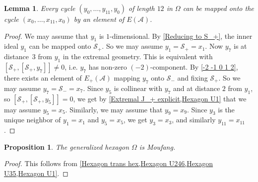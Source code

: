 \documentclass[oneside,a4paper]{amsart} %
\newtheorem{lemma}[theorem]{Lemma}
\newtheorem{proposition}[theorem]{Proposition}
\theoremstyle{definition}
\newcommand{\A}{\mathcal{A}}
\renewcommand{\SS}{\mathcal{S}}
\numberwithin{equation}{section}
\begin{document}
\begin{lemma}
\label{Hexagon trans hex}
	Every cycle $(y_0,\dots,y_{11},y_0)$ of length $12$ in $\Omega$ can be mapped onto the cycle $(x_0,\dots,x_{11},x_0)$ by an element of $E(\A)$.
\end{lemma}
\begin{proof}
	We may assume that $y_1$ is $1$-dimensional.
	By \cref{Reducing to S_+}, the inner ideal $y_1$ can be mapped onto $\SS_+$.
	So we may assume $y_1=\SS_+=x_1$.
	Now $y_7$ is at distance~$3$ from $y_1$ in the extremal geometry.
	This is equivalent with $[\SS_+,[\SS_+,y_7]]\neq 0$, i.e. $y_7$ has non-zero $(-2)$-component.
	By \cref{-2 -1 0 1 2}, there exists an element of $E_+(\A)$ mapping $y_7$ onto $\SS_-$ and fixing $\SS_+$.
	So we may assume $y_7=\SS_-=x_7$.
	Since $y_5$ is collinear with $y_7$ and at distance $2$ from $y_1$, so $[\SS_+,[\SS_+,y_5]]=0$, we get by \cref{Extremal J_+ explicit,Hexagon U1} that we may assume $y_5=x_5$.
	Similarly, we may assume that $y_9=x_9$.
	Since $y_3$ is the unique neighbor of $y_1=x_1$ and $y_5=x_5$, we get $y_3=x_3$, and similarly $y_{11}=x_{11}$. 
\end{proof}

\begin{proposition}
	The generalized hexagon $\Omega$ is Moufang.
\end{proposition}
\begin{proof}
	This follows from \cref{Hexagon trans hex,Hexagon U246,Hexagon U35,Hexagon U1}. 
\end{proof}
\end{document}
